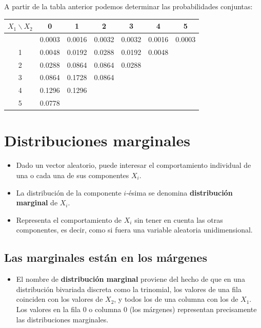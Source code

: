 \documentclass[
  a4paper,
  DIV=11,
  numbers=noendperiod]{scrreprt}
\providecommand{\tightlist}{%
  \setlength{\itemsep}{0pt}\setlength{\parskip}{0pt}}\usepackage{longtable,booktabs,array}
\begin{document}
A partir de la tabla anterior podemos determinar las probabilidades
conjuntas:

\begin{longtable}[]{@{}ccccccc@{}}
\toprule\noalign{}
\(X_{1} \backslash X_{2}\) & 0 & 1 & 2 & 3 & 4 & 5 \\
\midrule\noalign{}
\endhead
\bottomrule\noalign{}
\endlastfoot
0 & 0.0003 & 0.0016 & 0.0032 & 0.0032 & 0.0016 & 0.0003 \\
1 & 0.0048 & 0.0192 & 0.0288 & 0.0192 & 0.0048 & \\
2 & 0.0288 & 0.0864 & 0.0864 & 0.0288 & & \\
3 & 0.0864 & 0.1728 & 0.0864 & & & \\
4 & 0.1296 & 0.1296 & & & & \\
5 & 0.0778 & & & & & \\
\end{longtable}

\section{Distribuciones marginales}\label{distribuciones-marginales}

\begin{itemize}
\item
  Dado un vector aleatorio, puede interesar el comportamiento individual
  de una o cada una de sus componentes \(X_i\).
\item
  La distribución de la componente \(i\)-ésima se denomina
  \textbf{distribución marginal} de \(X_i\).
\item
  Representa el comportamiento de \(X_i\) sin tener en cuenta las otras
  componentes, es decir, como si fuera una variable aleatoria
  unidimensional.
\end{itemize}

\subsection{Las marginales están en los
márgenes}\label{las-marginales-estuxe1n-en-los-muxe1rgenes}

\begin{itemize}
\tightlist
\item
  El nombre de \textbf{distribución marginal} proviene del hecho de que
  en una distribución bivariada discreta como la trinomial, los valores
  de una fila coinciden con los valores de \(X_2\), y todos los de una
  columna con los de \(X_1\). Los valores en la fila 0 o columna 0 (los
  márgenes) representan precisamente las distribuciones marginales.
\end{itemize}
\end{document}
